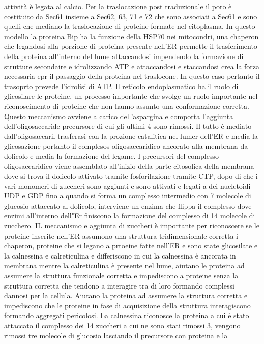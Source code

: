 attivit\`a \`e legata al calcio. Per la traslocazione post traduzionale il poro \`e costituito da Sec61 insieme a Sec62, 63, 71 e 72 che sono associati a Sec61 e sono quelli che mediano
la traslocazione di proteine formate nel citoplasma. In questo modello la proteina Bip ha la funzione della HSP70 nei mitocondri, una chaperon che legandosi alla porzione di proteina
presente nell'ER permette il trasferimento della proteina all'interno del lume attaccandosi impendendo la formazione di strutture secondaire e idrolizzando ATP e attaccandosi e 
staccandosi crea la forza necessaria epr il passaggio della proteina nel traslocone. In questo caso pertanto il trasoprto prevede l'idrolisi di ATP. Il reticolo endoplasmatico ha il 
ruolo di glicosilare le proteine, un processo importante che svolge un ruolo importante nel riconoscimento di proteine che non hanno assunto una conformazione corretta. Questo 
meccanismo avviene a carico dell'aspargina e comporta l'aggiunta dell'oligosaccaride precursore di cui gli ultimi 4 sono rimossi. Il tutto \`e mediato dall'oligosaccaril trasferasi
con la prozione catalitica nel lumer dell'ER e media la glicosazione portanto il complesos oligosaccaridico ancorato alla membrana da dolicolo e media la formazione del legame. I 
precursori del complesso oligosaccaridico viene assemblato all'inizio della parte citosolica della membrana dove si trova il dolicolo attivato tramite fosforilazione tramite CTP, dopo
di che i vari monomeri di zuccheri sono aggiunti e sono attivati e legati a dei nucletoidi UDP e GDP fino a quando si forma un complesso intermedio con 7 molecole di glucosio attaccato 
al dolicolo, interviene un enzima che flippa il complesso dove enzimi all'interno dell"Er finiscono la formazione del complesso di 14 molecole di zucchero. IL meccanismo e aggiunta di 
zuccheri \`e importante per riconoscere se le proteine inserite nell'ER assumono una struttura tridimensionale corretta i chaperon, proteine che si legano a prtoeine fatte nell'ER e sono
state glicosilate e la calnessina e calreticulina e differiscono in cui la calnessina \`e ancorata in membrana mentre la calreticulina \`e presente nel lume, aiutano le proteina ad 
assumere la struttura funzionale corretta e impediscono a proteine senza la struttura corretta che tendono a interagire tra di loro formando complessi dannosi per la cellula. Aiutano
la proteina ad assumere la struttura corretta e impediscono che le proteine in fase di acquisizione della struttura interagiscono formando aggregati pericolosi. La calnessina riconosce
la proteina a cui \`e stato attaccato il complesso dei 14 zuccheri a cui ne sono stati rimossi 3, vengono rimossi tre molecole di glucosio lasciando il precursore con proteina e la
